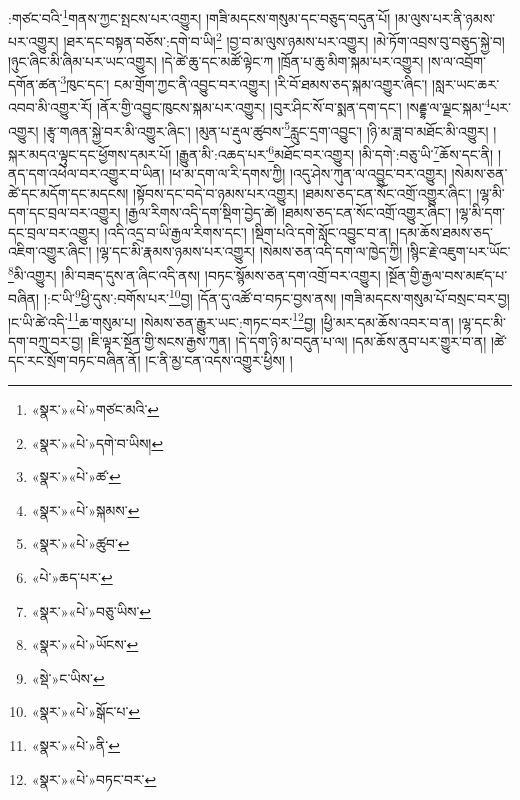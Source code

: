 :གཙང་བའི་\footnote{«སྣར་»«པེ་»གཙང་མའི་}གནས་ཀྱང་སྤངས་པར་འགྱུར། །གཟི་མདངས་གསུམ་དང་བཅུད་བདུན་པོ། །མ་ལུས་པར་ནི་ཉམས་པར་འགྱུར། །ཐར་དང་བསྟན་བཅོས་:དགེ་བ་ཡི།\footnote{«སྣར་»«པེ་»དགེ་བ་ཡིས།} །བྱ་བ་མ་ལུས་ཉམས་པར་འགྱུར། །མེ་ཏོག་འབྲས་བུ་བཅུད་སྐྱེ་བ། །ཉུང་ཞིང་མི་ཞིམ་པར་ཡང་འགྱུར། །དེ་ཚེ་ཆུ་དང་མཚོ་ལྟེང་ཀ །ཁྲོན་པ་ཆུ་མིག་སྐམ་པར་འགྱུར། །ས་ལ་འབྲོག་དགོན་ཚན་\footnote{«སྣར་»«པེ་»ཚ་}ཁུང་དང་། ངམ་གྲོག་ཀྱང་ནི་འབྱུང་བར་འགྱུར། །རི་བོ་ཐམས་ཅད་སྐམ་འགྱུར་ཞིང་། །སླར་ཡང་ཆར་འབབ་མི་འགྱུར་རོ། །ནོར་གྱི་འབྱུང་ཁུངས་སྐམ་པར་འགྱུར། །བུར་ཤིང་སོ་བ་སྨན་དག་དང་། །སརྡྷ་ལ་ལྗང་སྐམ་\footnote{«སྣར་»«པེ་»སྐམས་}པར་འགྱུར། །རྩྭ་གཞན་སྐྱེ་བར་མི་འགྱུར་ཞིང་། །མུན་པ་རྡུལ་ཚུབས་\footnote{«སྣར་»«པེ་»ཚུབ་}རླུང་དྲག་འབྱུང་། །ཉི་མ་ཟླ་བ་མཐོང་མི་འགྱུར། །སྐར་མདའ་ལྟུང་དང་ཕྱོགས་དམར་པོ། །རྒྱུན་མི་:འཆད་པར་\footnote{«པེ་»ཆད་པར་}མཐོང་བར་འགྱུར། །མི་དགེ་:བཅུ་ཡི་\footnote{«སྣར་»«པེ་»བཅུ་ཡིས་}ཆོས་དང་ནི། །ནད་དག་འཕེལ་བར་འགྱུར་བ་ཡིན། །ཕ་མ་དག་ལ་རི་དགས་ཀྱི། །འདུ་ཤེས་ཀུན་ལ་འབྱུང་བར་འགྱུར། །སེམས་ཅན་ཚེ་དང་མདོག་དང་མདངས། །སྟོབས་དང་བདེ་བ་ཉམས་པར་འགྱུར། །ཐམས་ཅད་ངན་སོང་འགྲོ་འགྱུར་ཞིང་། །ལྷ་མི་དག་དང་བྲལ་བར་འགྱུར། །རྒྱལ་རིགས་འདི་དག་སྡིག་བྱེད་ཚེ། །ཐམས་ཅད་ངན་སོང་འགྲོ་འགྱུར་ཞིང་། །ལྷ་མི་དག་དང་བྲལ་བར་འགྱུར། །འདི་འདྲ་བ་ཡི་རྒྱལ་རིགས་དང་། །སྡིག་པའི་དགེ་སློང་འབྱུང་བ་ན། །དམ་ཆོས་ཐམས་ཅད་འཇིག་འགྱུར་ཞིང་། །ལྷ་དང་མི་རྣམས་ཉམས་པར་འགྱུར། །སེམས་ཅན་འདི་དག་ལ་ཁྱེད་ཀྱི། །སྙིང་རྗེ་འཇུག་པར་ཡོང་\footnote{«སྣར་»«པེ་»ཡོངས་}མི་འགྱུར། །མི་བཟད་དུས་ན་ཞིང་འདི་ནས། །བཏང་སྙོམས་ཅན་དག་འགྲོ་བར་འགྱུར། །སྔོན་གྱི་རྒྱལ་བས་མཛད་པ་བཞིན། །:ང་ཡི་\footnote{«སྡེ་»ང་ཡིས་}ཕྱི་དུས་:བགོས་པར་\footnote{«སྣར་»«པེ་»སྒོང་པ་}བྱ། །དོན་དུ་འཚོ་བ་བཏང་བྱས་ནས། །གཟི་མདངས་གསུམ་པོ་བསྲང་བར་བྱ། །ང་ཡི་ཚེ་འདི་\footnote{«སྣར་»«པེ་»ནི་}ཆ་གསུམ་པ། །སེམས་ཅན་རྒྱུར་ཡང་:གཏང་བར་\footnote{«སྣར་»«པེ་»བཏང་བར་}བྱ། །ཕྱི་མར་དམ་ཆོས་འབར་བ་ན། །ལྷ་དང་མི་དག་བཀྲུ་བར་བྱ། །ཇི་ལྟར་སྔོན་གྱི་སངས་རྒྱས་ཀུན། །དེ་དག་ཉི་མ་བདུན་པ་ལ། །དམ་ཆོས་ནུབ་པར་གྱུར་བ་ན། །ཚེ་དང་རང་སྲོག་བཏང་བཞིན་ནོ། །ང་ནི་མྱ་ངན་འདས་འགྱུར་ཕྱིས། །
